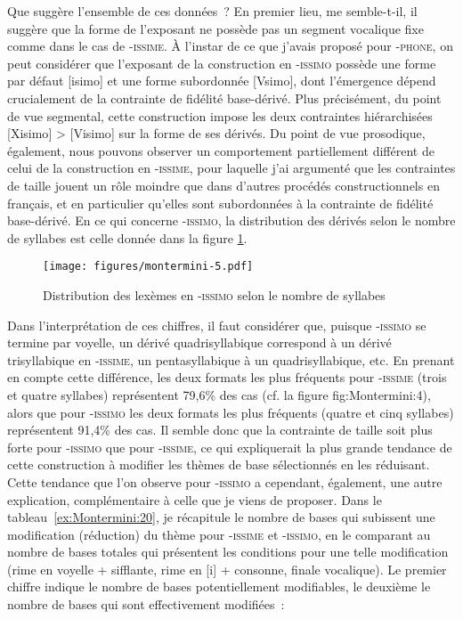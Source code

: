 \documentclass[output=paper]{langsci/langscibook}
\begin{document}
Que suggère l'ensemble de ces données~? En premier lieu, me semble-t-il,
il suggère que la forme de l'exposant ne possède pas un segment
vocalique fixe comme dans le cas de -\textsc{issime}. À l'instar de ce
que j'avais proposé pour -\textsc{phone}, on peut considérer que
l'exposant de la construction en -\textsc{issimo} possède une forme par
défaut {[}isimo{]} et une forme subordonnée {[}Vsimo{]}, dont
l'émergence dépend crucialement de la contrainte de fidélité
base-dérivé. Plus précisément, du point de vue segmental, cette
construction impose les deux contraintes hiérarchisées {[}Xisimo{]}
\textgreater{} {[}Visimo{]} sur la forme de ses dérivés. Du point de vue
prosodique, également, nous pouvons observer un comportement
partiellement différent de celui de la construction en -\textsc{issime},
pour laquelle j'ai argumenté que les contraintes de taille jouent un
rôle moindre que dans d'autres procédés constructionnels en français, et
en particulier qu'elles sont subordonnées à la contrainte de fidélité
base-dérivé. En ce qui concerne -\textsc{issimo}, la distribution des
dérivés selon le nombre de syllabes est celle donnée dans la figure \ref{fig:Montermini:5}.

\begin{figure}
\texttt{[image: figures/montermini-5.pdf]}
\caption{Distribution des lexèmes en \textsc{-issimo} selon le
nombre de syllabes}
\label{fig:Montermini:5}
\end{figure}

\largerpage 
Dans l'interprétation de ces chiffres, il faut considérer que, puisque
-\textsc{issimo} se termine par voyelle, un dérivé quadrisyllabique
correspond à un dérivé trisyllabique en -\textsc{issime}, un
pentasyllabique à un quadrisyllabique, etc. En prenant en compte cette
différence, les deux formats les plus fréquents pour -\textsc{issime}
(trois et quatre syllabes) représentent 79,6\% des cas (cf. la figure
{fig:Montermini:4}), alors que pour -\textsc{issimo} les deux formats les plus fréquents
(quatre et cinq syllabes) représentent 91,4\% des cas. Il semble donc
que la contrainte de taille soit plus forte pour -\textsc{issimo} que
pour -\textsc{issime}, ce qui expliquerait la plus grande tendance de
cette construction à modifier les thèmes de base sélectionnés en les
réduisant. Cette tendance que l'on observe pour -\textsc{issimo} a
cependant, également, une autre explication, complémentaire à celle que
je viens de proposer. Dans le tableau~\ref{ex:Montermini:20}, je récapitule le nombre de bases qui
subissent une modification (réduction) du thème pour -\textsc{issime} et
-\textsc{issimo}, en le comparant au nombre de bases totales qui
présentent les conditions pour une telle modification (rime en voyelle +
sifflante, rime en {[}i{]} + consonne, finale vocalique). Le premier
chiffre indique le nombre de bases potentiellement modifiables, le
deuxième le nombre de bases qui sont effectivement modifiées~:
\end{document}
